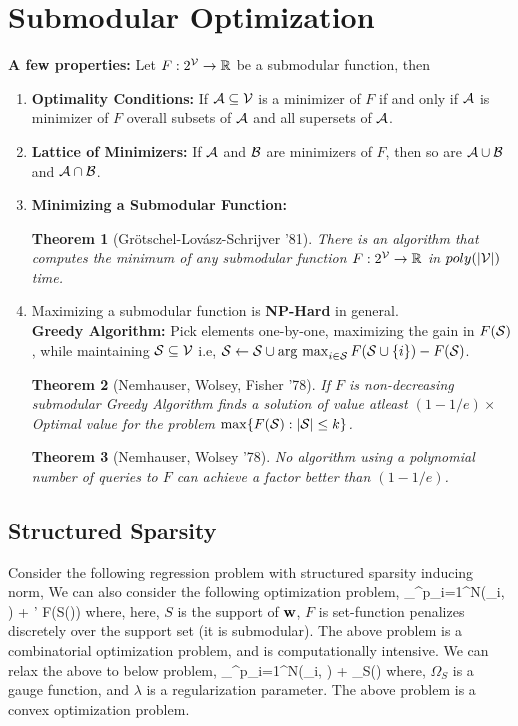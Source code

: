 \documentclass[11pt]{article}
\newtheorem{theorem}{Theorem}{\bf}{\it}
\begin{document}
\section{Submodular Optimization}
\textbf{A few properties:} Let $F: 2^{\V} \to \R$ be a submodular function, then
\begin{enumerate}
\item \textbf{Optimality Conditions:} If $\A \subseteq \V$ is a minimizer of $F$ if and only if $\A$ is minimizer of $F$ overall
subsets of $\A$ and all supersets of $\A$.
\item \textbf{Lattice of Minimizers:} If $\A$ and $\B$ are minimizers of $F$, then so are $\A \cup \B$ and $\A \cap \B$.
\item \textbf{Minimizing a Submodular Function:} 
\begin{theorem}[Grötschel-Lovász-Schrijver '81]
  There is an algorithm that computes the minimum of any submodular
  function $F: 2^{\V} \to \R$ in $poly(|\V|)$ time.
\end{theorem}
\item Maximizing a submodular function is \textbf{NP-Hard} in general.\\
\textbf{Greedy Algorithm:} Pick elements one-by-one, maximizing the gain
in $F(\S)$, while maintaining $\S \subseteq \V$ i.e, $\S \gets \S \cup \argmax_{i \in \S}F(\S \cup \{i\}) - F(\S)$.
\begin{theorem}[Nemhauser, Wolsey, Fisher ’78]
If $F$ is non-decreasing submodular Greedy Algorithm finds a solution
of value atleast $(1-1/e) \times$ Optimal value for the problem $\max\{F(\S): |\S| \leq k\}$.
\end{theorem}
\begin{theorem}[Nemhauser, Wolsey ’78]
No algorithm using a polynomial number of
queries to $F$ can achieve a factor better than $(1-1/e)$.
\end{theorem}

\end{enumerate}

\subsection{Structured Sparsity}
Consider the following regression problem with structured sparsity inducing norm,
We can also consider the following optimization problem,
\bd
\min_{\w \in \R^{p}}\sum_{i=1}^{N}(\y_i, ) + \lambda' F(S(\w))
\ed
where, here, $S$ is the support of $\w$, $F$ is set-function penalizes discretely over the support set 
(it is submodular). The above problem
is a combinatorial optimization problem, and is computationally intensive. We can relax the above to below problem,
\bd
\min_{\w \in \R^p}\sum_{i=1}^{N}(\y_i, ) + \lambda \Omega_{S}(\w)
\ed
where, $\Omega_{S}$ is a gauge function, and $\lambda$ is a regularization parameter. The above problem is a convex optimization problem.
\end{document}
